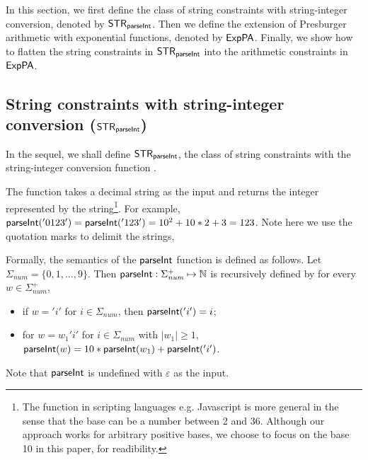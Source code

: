
In this section, we first define the class of string constraints with string-integer conversion, denoted by ${\sf STR}_{\textsf{parseInt}}$. Then we define the extension of Presburger arithmetic with exponential functions, denoted by ${\sf ExpPA}$. Finally, we show how to flatten the string constraints in ${\sf STR}_{\textsf{parseInt}}$ into the arithmetic constraints in ${\sf ExpPA}$.

\subsection{String constraints with string-integer conversion (${\sf STR}_{\textsf{parseInt}}$)}

In the sequel, we shall define ${\sf STR}_{\textsf{parseInt}}$, the class of string constraints with the string-integer conversion function {\parseInt}.

The function  {\parseInt} takes a decimal string as the input and returns the integer represented by the string\footnote{The {\parseInt} function in scripting languages e.g. Javascript is more general in the sense that the base can be a number between 2 and 36. Although our approach works for arbitrary positive bases, we choose to focus on the base 10 in this paper, for readibility.}.
For example,
${\textsf{parseInt}}('0123') = {\textsf{parseInt}}('123')=10^2+10*2+3 = 123$. 
Note here we use the quotation marks to delimit the strings, 

Formally, the semantics of the $\textsf{parseInt}$ function is defined as follows. 
Let $\Sigma_{\textit{num}}=\{0,1, \ldots, 9\}$. Then ${\textsf{parseInt}}: \Sigma_{\textit{num}}^+ \mapsto \mathbb{N}$ is recursively defined by
    for every $w\in \Sigma_{\textit{num}}^+$,
    \begin{itemize}
        \item if $w={'i'}$ for $i \in \Sigma_{\textit{num}}$, then ${\textsf{parseInt}}('i')=i$;
        \item for $w = w_1 {'i'}$ for $i \in \Sigma_{\textit{num}}$ with $|w_1| \ge 1$, 
        ${\textsf{parseInt}}(w) = 10*{\textsf{parseInt}}(w_1)+{\textsf{parseInt}}({'i'})$.
    \end{itemize} 
Note that $\textsf{parseInt}$ is undefined with $\varepsilon$ as the input.


